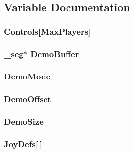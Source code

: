 \subsection{Variable Documentation}
\hypertarget{ID__IN_8H_a9cf23a083833e7437416b3a0fedae789}{
\subsubsection[{Controls}]{ {\bf Controls}\mbox{[}MaxPlayers\mbox{]}}}
\label{ID__IN_8H_a9cf23a083833e7437416b3a0fedae789}
\hypertarget{ID__IN_8H_ab667a009823ca43974aa23e0ed2e2d33}{
\subsubsection[{DemoBuffer}]{ \_\-seg$\ast$ {\bf DemoBuffer}}}
\label{ID__IN_8H_ab667a009823ca43974aa23e0ed2e2d33}
\hypertarget{ID__IN_8H_a3f08b9ae9c5b54f2990ec177babb74ef}{
\subsubsection[{DemoMode}]{ {\bf DemoMode}}}
\label{ID__IN_8H_a3f08b9ae9c5b54f2990ec177babb74ef}
\hypertarget{ID__IN_8H_a0e890514eba321a0ca518018964e3a63}{
\subsubsection[{DemoOffset}]{ {\bf DemoOffset}}}
\label{ID__IN_8H_a0e890514eba321a0ca518018964e3a63}
\hypertarget{ID__IN_8H_a8486d18dcabfa7a32dc114edc70ae0c6}{
\subsubsection[{DemoSize}]{ {\bf DemoSize}}}
\label{ID__IN_8H_a8486d18dcabfa7a32dc114edc70ae0c6}
\hypertarget{ID__IN_8H_ae9a67b60e05d6d05152b6e9d21f75529}{
\subsubsection[{JoyDefs}]{ {\bf JoyDefs}\mbox{[}$\,$\mbox{]}}}
